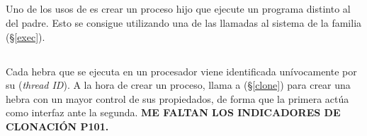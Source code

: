 \subsection{}

Uno de los usos de  es crear un proceso hijo que ejecute un programa distinto al del padre.
Esto se consigue utilizando una de las llamadas al sistema de la familia  (\S\ref{exec}).

\subsection{}

Cada hebra que se ejecuta en un procesador viene identificada unívocamente por su  (\emph{thread ID}).
A la hora de crear un proceso,  llama a  (\S\ref{clone})  para crear una hebra con un mayor control de sus propiedados, de forma que la primera actúa como interfaz ante la segunda.
\textbf{ME FALTAN LOS INDICADORES DE CLONACIÓN P101.}

